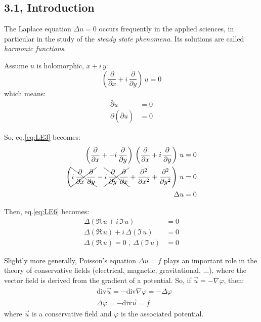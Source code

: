 \documentclass[../main.tex]{subfiles}
\begin{document}
\subsection{3.1, Introduction}

The Laplace equation $\Delta u = 0$ occurs frequently in the applied sciences, in particular in the study of the \textit{steady state phenomena}. Its solutions are called \textit{harmonic functions}.

Assume $u$ is holomorphic, $x + i \, y$:
\begin{equation} \label{eq:LE1}
    \left(\frac{\partial}{\partial x} + i \, \frac{\partial}{\partial y} \right) \, u = 0
\end{equation}
which means:
\begin{align}
    \bar{\partial} u &= 0  \label{eq:LE2}\\
    \partial (\bar{\partial} u) &= 0 \label{eq:LE3}
\end{align}

So, eq.\ref{eq:LE3} becomes:
\begin{align}
    \left(\frac{\partial}{\partial x} +- i \, \frac{\partial}{\partial y} \right) \, \left(\frac{\partial}{\partial x} + i \, \frac{\partial}{\partial y} \right) \, u = 0 \label{eq:LE4} \\
    \left(\xcancel{i \,  \frac{\partial}{\partial x} \, \frac{\partial}{\partial y}} - \xcancel{i \,  \frac{\partial}{\partial y} \, \frac{\partial}{\partial x}} + \frac{\partial^2}{\partial x^2} +  \frac{\partial^2}{\partial y^2} \right) \, u = 0 \label{eq:LE5} \\
    \Delta u = 0 \label{eq:LE6}
 \end{align}

Then, eq.\ref{eq:LE6} becomes:
\begin{align}
    \Delta (\Re \, u + i \, \Im \, u) &= 0 \label{eq:LE7} \\
    \Delta (\Re \, u) + i \, \Delta (\Im \, u) &= 0 \nonumber \\
    \Delta (\Re \, u) = 0 \text{ ,  }\Delta (\Im \, u) &= 0 \label{eq:LE8}
\end{align}

Slightly more generally, Poisson’s equation $\Delta u = f$ plays an important role in the theory of conservative fields (electrical, magnetic, gravitational, ...), where the vector field is derived from the gradient of a potential. So, if $\vec{u} = - \nabla \varphi$, then:
\begin{align}
    & \mathrm{div} \vec{u} = - \mathrm{div} \nabla \varphi = - \Delta \varphi \label{eq:LE9} \\
    & \Delta \varphi = - \mathrm{div} \vec{u} = f \label{eq:LE10}
\end{align}
where $\vec{u}$ is a conservative field and $\varphi$ is the associated potential.
\end{document}
